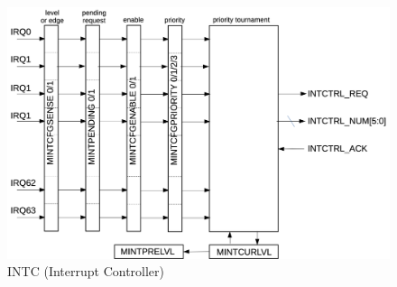 \begin{figure}[H]
    \includegraphics[width=1.00\columnwidth]{./Figure/Interrupts_INTC.png}
    \caption{INTC (Interrupt Controller)}
    \label{fig:INTERRUPTS_INTC}
\end{figure}

